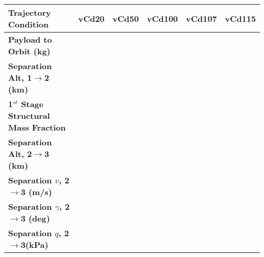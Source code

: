 \section{}
\begin{table}[ht]
\begin{tabular}{l c c c c c} 
	\hline \textbf{Trajectory Condition}
	&vCd20
	&vCd50
	&vCd100
	&vCd107
	&vCd115
	\\
	\hline \textbf{Payload to Orbit (kg)}
	& \PayloadToOrbitvCdtwentypercent
	& \PayloadToOrbitvCdfiftypercent
	& \PayloadToOrbitvCdonehundredpercent
	& \PayloadToOrbitvCdonehundredandsevenpercent
	& \PayloadToOrbitvCdonehundredandfifteenpercent
	\\
	\textbf{Separation Alt, 1$\rightarrow$2 (km)}
	& \firstsecondSeparationAltvCdtwentypercent
	& \firstsecondSeparationAltvCdfiftypercent
	& \firstsecondSeparationAltvCdonehundredpercent
	& \firstsecondSeparationAltvCdonehundredandsevenpercent
	& \firstsecondSeparationAltvCdonehundredandfifteenpercent
	\\
	\textbf{1$^{st}$ Stage Structural Mass Fraction}
	& \FirstStageSMFvCdtwentypercent
	& \FirstStageSMFvCdfiftypercent
	& \FirstStageSMFvCdonehundredpercent
	& \FirstStageSMFvCdonehundredandsevenpercent
	& \FirstStageSMFvCdonehundredandfifteenpercent
	\\
	\textbf{Separation Alt, 2$\rightarrow$3 (km)}
	& \secondthirdSeparationAltvCdtwentypercent
	& \secondthirdSeparationAltvCdfiftypercent
	& \secondthirdSeparationAltvCdonehundredpercent
	& \secondthirdSeparationAltvCdonehundredandsevenpercent
	& \secondthirdSeparationAltvCdonehundredandfifteenpercent
	\\
	\textbf{Separation $v$, 2$\rightarrow$3 (m/s)}
	& \secondthirdSeparationvvCdtwentypercent
	& \secondthirdSeparationvvCdfiftypercent
	& \secondthirdSeparationvvCdonehundredpercent
	& \secondthirdSeparationvvCdonehundredandsevenpercent
	& \secondthirdSeparationvvCdonehundredandfifteenpercent
	\\
	\textbf{Separation $\gamma$, 2$\rightarrow$3 (deg)}
	& \secondthirdSeparationgammavCdtwentypercent
	& \secondthirdSeparationgammavCdfiftypercent
	& \secondthirdSeparationgammavCdonehundredpercent
	& \secondthirdSeparationgammavCdonehundredandsevenpercent
	& \secondthirdSeparationgammavCdonehundredandfifteenpercent
	\\
	\textbf{Separation $q$, 2$\rightarrow$3(kPa)}
	& \secondthirdSeparationqvCdtwentypercent
	& \secondthirdSeparationqvCdfiftypercent
	& \secondthirdSeparationqvCdonehundredpercent
	& \secondthirdSeparationqvCdonehundredandsevenpercent

\end{tabular}
\end{table}
